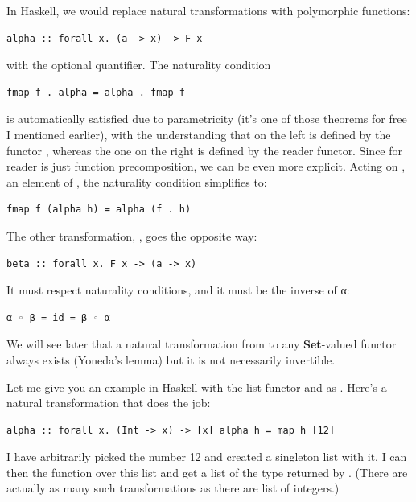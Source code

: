 In Haskell, we would replace natural transformations with polymorphic
functions:

\begin{verbatim}
alpha :: forall x. (a -> x) -> F x
\end{verbatim}

with the optional  quantifier. The naturality condition

\begin{verbatim}
fmap f . alpha = alpha . fmap f
\end{verbatim}

is automatically satisfied due to parametricity (it's one of those
theorems for free I mentioned earlier), with the understanding that
 on the left is defined by the functor , whereas
the one on the right is defined by the reader functor. Since
 for reader is just function precomposition, we can be even
more explicit. Acting on , an element of ,
the naturality condition simplifies to:

\begin{verbatim}
fmap f (alpha h) = alpha (f . h)
\end{verbatim}

The other transformation, , goes the opposite way:

\begin{verbatim}
beta :: forall x. F x -> (a -> x)
\end{verbatim}

It must respect naturality conditions, and it must be the inverse of α:

\begin{verbatim}
α ◦ β = id = β ◦ α
\end{verbatim}

We will see later that a natural transformation from 
to any \textbf{Set}-valued functor always exists (Yoneda's lemma) but it
is not necessarily invertible.

Let me give you an example in Haskell with the list functor and
 as . Here's a natural transformation that does
the job:

\begin{verbatim}
alpha :: forall x. (Int -> x) -> [x] alpha h = map h [12]
\end{verbatim}

I have arbitrarily picked the number 12 and created a singleton list
with it. I can then  the function  over this list
and get a list of the type returned by . (There are actually
as many such transformations as there are list of integers.)

